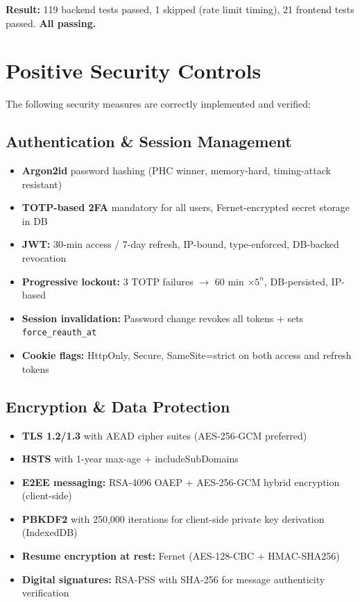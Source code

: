 \documentclass[11pt,a4paper]{article}
\begin{document}
\textbf{Result:} 119 backend tests passed, 1 skipped (rate limit timing), 21 frontend tests passed. \textbf{All passing.}

\newpage
\section{Positive Security Controls}

The following security measures are correctly implemented and verified:

\subsection{Authentication \& Session Management}
\begin{itemize}[nosep]
  \item \textbf{Argon2id} password hashing (PHC winner, memory-hard, timing-attack resistant)
  \item \textbf{TOTP-based 2FA} mandatory for all users, Fernet-encrypted secret storage in DB
  \item \textbf{JWT:} 30-min access / 7-day refresh, IP-bound, type-enforced, DB-backed revocation
  \item \textbf{Progressive lockout:} 3 TOTP failures $\rightarrow$ 60 min $\times 5^n$, DB-persisted, IP-based
  \item \textbf{Session invalidation:} Password change revokes all tokens + sets \texttt{force\_reauth\_at}
  \item \textbf{Cookie flags:} HttpOnly, Secure, SameSite=strict on both access and refresh tokens
\end{itemize}

\subsection{Encryption \& Data Protection}
\begin{itemize}[nosep]
  \item \textbf{TLS 1.2/1.3} with AEAD cipher suites (AES-256-GCM preferred)
  \item \textbf{HSTS} with 1-year max-age + includeSubDomains
  \item \textbf{E2EE messaging:} RSA-4096 OAEP + AES-256-GCM hybrid encryption (client-side)
  \item \textbf{PBKDF2} with 250,000 iterations for client-side private key derivation (IndexedDB)
  \item \textbf{Resume encryption at rest:} Fernet (AES-128-CBC + HMAC-SHA256)
  \item \textbf{Digital signatures:} RSA-PSS with SHA-256 for message authenticity verification
\end{itemize}
\end{document}
